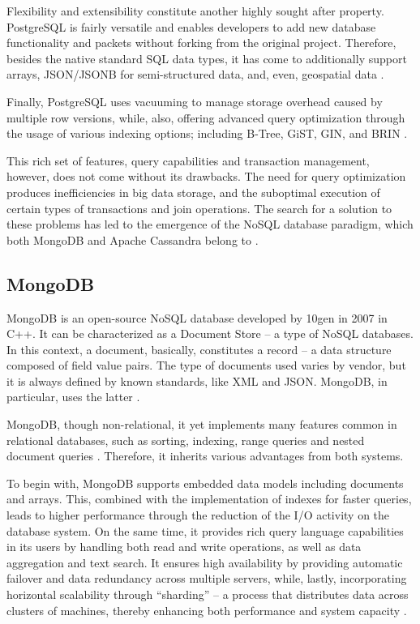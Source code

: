 \documentclass[conference]{IEEEtran}
\begin{document}
Flexibility and extensibility constitute another highly sought after property. PostgreSQL is fairly versatile and enables developers to add new database functionality and packets without forking from the original project. Therefore, besides the native standard SQL data types, it has come to additionally support arrays, JSON/JSONB for semi-structured data, and, even, geospatial data \cite{b6,b9,b10}.

Finally, PostgreSQL uses vacuuming to manage storage overhead caused by multiple row versions, while, also, offering advanced query optimization through the usage of various indexing options; including B-Tree, GiST, GIN, and BRIN \cite{b6}.

This rich set of features, query capabilities and transaction management, however, does not come without its drawbacks. The need for query optimization produces inefficiencies in big data storage, and the suboptimal execution of certain types of transactions and join operations. The search for a solution to these problems has led to the emergence of the NoSQL database paradigm, which both MongoDB and Apache Cassandra belong to \cite{b11}.


\subsection{MongoDB}

MongoDB is an open-source NoSQL database developed by 10gen in 2007 in C++. It can be characterized as a Document Store – a type of NoSQL databases. In this context, a document, basically, constitutes a record – a data structure composed of field value pairs. The type of documents used varies by vendor, but it is always defined by known standards, like XML and JSON. MongoDB, in particular, uses the latter \cite{b5, b11, b12}.

MongoDB, though non-relational, it yet implements many features common in relational databases, such as sorting, indexing, range queries and nested document queries \cite{b5}. Therefore, it inherits various advantages from both systems.

To begin with, MongoDB supports embedded data models including documents and arrays. This, combined with the implementation of indexes for faster queries, leads to higher performance through the reduction of the I/O activity on the database system. On the same time, it provides rich query language capabilities in its users by handling both read and write operations, as well as data aggregation and text search. It ensures high availability by providing automatic failover and data redundancy across multiple servers, while, lastly, incorporating horizontal scalability through “sharding” – a process that distributes data across clusters of machines, thereby enhancing both performance and system capacity \cite{b12}.
\end{document}
